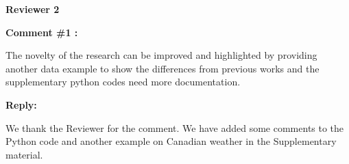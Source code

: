 \documentclass[11pt]{article}
\begin{document}
\bigskip


\itshape



{\large \textbf{Reviewer 2} }


\bigskip

\itshape


\textbf{Comment \#1 :}

The novelty of the research can be improved and highlighted by providing another data example to show the differences from previous works and the supplementary python codes need more documentation.

\medskip

\normalfont

\textbf{Reply:} 

We thank the Reviewer for the comment. We have added some comments to the Python code and another example on Canadian weather in the Supplementary material.

\bigskip

\itshape

%
% 
\end{document}
